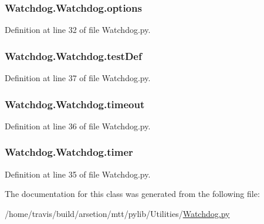 \hypertarget{classWatchdog_1_1Watchdog_a5ceb06fde29b89623d7a230ae080abe6}{
\subsubsection[{options}]{\setlength{\rightskip}{0pt plus 5cm}Watchdog.\-Watchdog.\-options}}\label{classWatchdog_1_1Watchdog_a5ceb06fde29b89623d7a230ae080abe6}


Definition at line 32 of file Watchdog.\-py.

\hypertarget{classWatchdog_1_1Watchdog_abc547688f9ff2ab9350b028c6f122997}{
\subsubsection[{test\-Def}]{\setlength{\rightskip}{0pt plus 5cm}Watchdog.\-Watchdog.\-test\-Def}}\label{classWatchdog_1_1Watchdog_abc547688f9ff2ab9350b028c6f122997}


Definition at line 37 of file Watchdog.\-py.

\hypertarget{classWatchdog_1_1Watchdog_a62dc7dad113fcda93fe4f8855ac037db}{
\subsubsection[{timeout}]{\setlength{\rightskip}{0pt plus 5cm}Watchdog.\-Watchdog.\-timeout}}\label{classWatchdog_1_1Watchdog_a62dc7dad113fcda93fe4f8855ac037db}


Definition at line 36 of file Watchdog.\-py.

\hypertarget{classWatchdog_1_1Watchdog_ae03efeba550ed8039ab79a8414b8be82}{
\subsubsection[{timer}]{\setlength{\rightskip}{0pt plus 5cm}Watchdog.\-Watchdog.\-timer}}\label{classWatchdog_1_1Watchdog_ae03efeba550ed8039ab79a8414b8be82}


Definition at line 35 of file Watchdog.\-py.



The documentation for this class was generated from the following file\-:\begin{DoxyCompactItemize}
\item 
/home/travis/build/arsetion/mtt/pylib/\-Utilities/\hyperlink{Watchdog_8py}{Watchdog.\-py}\end{DoxyCompactItemize}
